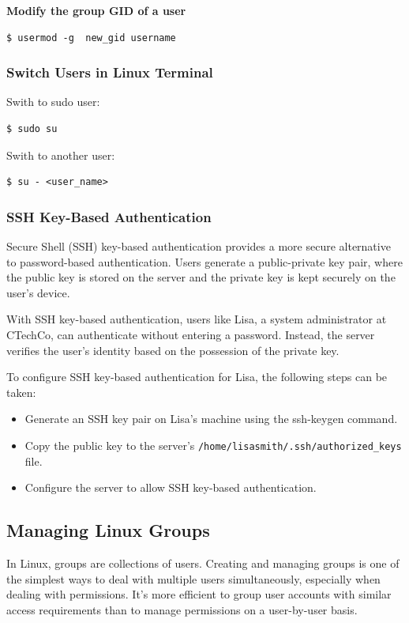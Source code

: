\documentclass{article}
\newenvironment{codetemplate}[1][]{%
  \mybasecolorbox[#1]
  \itshape
}{%
  \endmybasecolorbox
}
\begin{document}
\textbf{Modify the group GID of a user}
\begin{codetemplate}{}
\begin{verbatim}
$ usermod -g  new_gid username
\end{verbatim}
\end{codetemplate}

\subsubsection{Switch Users in Linux Terminal}
Swith to sudo user:
\begin{codetemplate}{}
\begin{verbatim}
$ sudo su
\end{verbatim}
\end{codetemplate}

Swith to another user:
\begin{codetemplate}{}
\begin{verbatim}
$ su - <user_name>
\end{verbatim}
\end{codetemplate}


\subsubsection{SSH Key-Based Authentication}
Secure Shell (SSH) key-based authentication provides a more secure alternative to password-based authentication. Users generate a public-private key pair, where the public key is stored on the server and the private key is kept securely on the user's device.

With SSH key-based authentication, users like Lisa, a system administrator at CTechCo, can authenticate without entering a password. Instead, the server verifies the user's identity based on the possession of the private key.

To configure SSH key-based authentication for Lisa, the following steps can be taken:

\begin{itemize}
    \item Generate an SSH key pair on Lisa's machine using the ssh-keygen command.
    \item Copy the public key to the server's \verb|/home/lisasmith/.ssh/authorized_keys| file.
    \item Configure the server to allow SSH key-based authentication.
\end{itemize}


\subsection{Managing Linux Groups}
In Linux, groups are collections of users. Creating and managing groups is one of the simplest ways to deal with multiple users simultaneously, especially when dealing with permissions. It's more efficient to group user accounts with similar access requirements than to manage permissions on a user-by-user basis.
\end{document}
